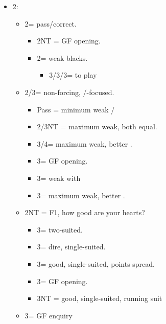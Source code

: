 \documentclass[a4paper,14pt]{extarticle}
\begin{document}
\begin{itemize}
\begin{itemize}
	\end{itemize}

\newpage

\item 2\diamonds:
	\begin{itemize}
   \item 2\hearts = pass/correct.
		\begin{itemize}
      \item 2NT = GF opening.
      \item 2\spades = weak blacks.
			\begin{itemize}
			\item 3\clubs/3\diamonds/3\hearts = to play
			\end{itemize}
		\end{itemize}
   \item 2\spades/3\clubs = non-forcing, \clubs/\spades-focused.
		\begin{itemize}
		\item Pass = minimum weak \clubs/\spades
      \item 2/3NT = maximum weak, both equal.
      \item 3/4\clubs = maximum weak, better \clubs.
      \item 3\diamonds = GF opening.
      \item 3\hearts = weak with \hearts
      \item 3\spades = maximum weak, better \spades.
		\end{itemize}
   \item 2NT = F1, how good are your hearts?
		\begin{itemize}
      \item 3\clubs = two-suited.
      \item 3\diamonds = dire, single-suited.
      \item 3\hearts = good, single-suited, points spread.
      \item 3\spades = GF opening.
      \item 3NT = good, single-suited, running suit
		\end{itemize}
	\item 3\diamonds = GF enquiry
	\end{itemize}

\newpage


\end{itemize}
\end{document}
